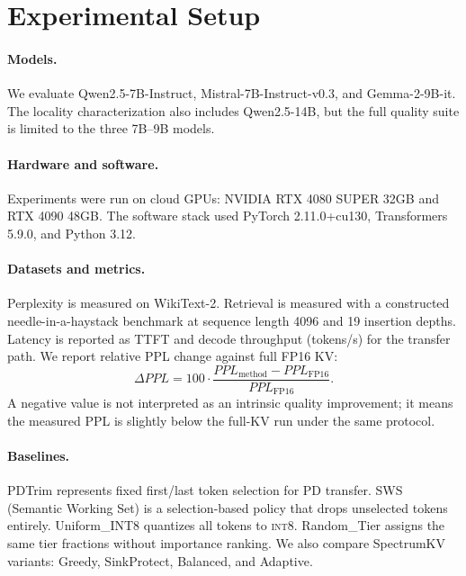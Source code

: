 \documentclass[11pt]{article}
\newcommand{\method}{SpectrumKV}
\newcommand{\ppl}{PPL}
\newcommand{\intviii}{\textsc{int8}}
\theoremstyle{plain}
\theoremstyle{definition}
\begin{document}
\section{Experimental Setup}
\label{sec:setup}

\paragraph{Models.}
We evaluate Qwen2.5-7B-Instruct, Mistral-7B-Instruct-v0.3, and Gemma-2-9B-it.  The locality characterization also includes Qwen2.5-14B, but the full quality suite is limited to the three 7B--9B models.

\paragraph{Hardware and software.}
Experiments were run on cloud GPUs: NVIDIA RTX 4080 SUPER 32GB and RTX 4090 48GB.  The software stack used PyTorch 2.11.0+cu130, Transformers 5.9.0, and Python 3.12.

\paragraph{Datasets and metrics.}
Perplexity is measured on WikiText-2.  Retrieval is measured with a constructed needle-in-a-haystack benchmark at sequence length 4096 and 19 insertion depths.  Latency is reported as TTFT and decode throughput (tokens/s) for the transfer path.  We report relative PPL change against full FP16 KV:
\begin{equation}
  \Delta \ppl = 100\cdot\frac{\ppl_{\mathrm{method}}-\ppl_{\mathrm{FP16}}}{\ppl_{\mathrm{FP16}}}.
\end{equation}
A negative value is not interpreted as an intrinsic quality improvement; it means the measured PPL is slightly below the full-KV run under the same protocol.

\paragraph{Baselines.}
PDTrim represents fixed first/last token selection for PD transfer.  SWS (Semantic Working Set) is a selection-based policy that drops unselected tokens entirely.  Uniform\_INT8 quantizes all tokens to \intviii{}.  Random\_Tier assigns the same tier fractions without importance ranking.  We also compare \method{} variants: Greedy, SinkProtect, Balanced, and Adaptive.
\end{document}
